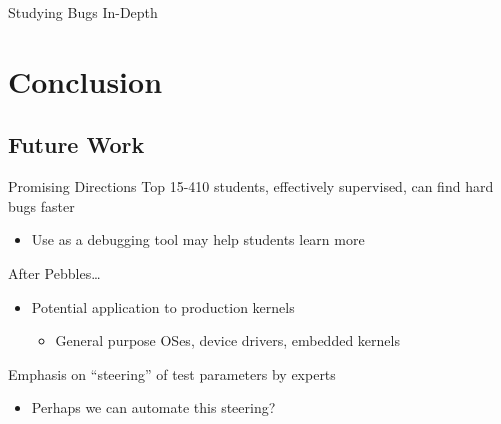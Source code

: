 \documentclass[xcolor=dvipsnames]{beamer}
\begin{document}
\begin{frame}{Studying Bugs In-Depth} %
\end{frame}

\section{Conclusion}

\subsection{Future Work}
\begin{frame}{Promising Directions}
	Top 15-410 students, effectively supervised, can find hard bugs faster
	\begin{itemize}
		\item Use as a debugging tool may help students learn more
	\end{itemize}
	\linegap

	After Pebbles\dots
	\begin{itemize}
		\item Potential application to production kernels
		\begin{itemize}
			\item General purpose OSes, device drivers, embedded kernels
		\end{itemize}
	\end{itemize}
	\linegap

	Emphasis on ``steering'' of test parameters by experts
	\begin{itemize}
		\item Perhaps we can automate this steering?
	\end{itemize}
	\linegap
\end{frame}
\end{document}
